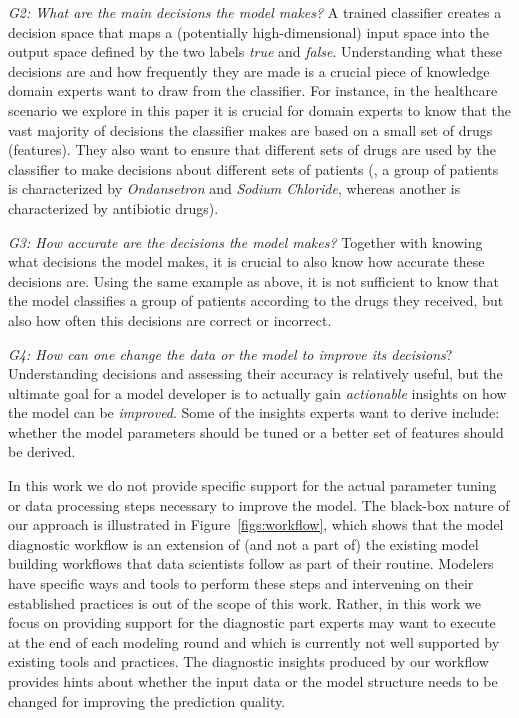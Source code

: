 \textit{G2: What are the main decisions the model makes?} A trained classifier creates a decision space that maps a (potentially high-dimensional) input space into the output space defined by the two labels \textit{true} and \textit{false}. Understanding what these decisions are and how frequently they are made is a crucial piece of knowledge domain experts want to draw from the classifier. For instance, in the healthcare scenario we explore in this paper it is crucial for domain experts to know that the vast majority of decisions the classifier makes are based on a small set of drugs (features). They also want to ensure that different sets of drugs are used by the classifier to make decisions about different sets of patients (\eg, a group of patients is characterized by \emph{Ondansetron} and \emph{Sodium Chloride}, whereas another is characterized by antibiotic drugs).

\textit{G3: How accurate are the decisions the model makes?} Together with knowing what decisions the model makes, it is crucial to also know how accurate these decisions are. Using the same example as above, it is not sufficient to know that the model classifies a group of patients according to the drugs they received, but also how often this decisions are correct or incorrect.

\textit{G4: How can one change the data or the model to improve its decisions}? Understanding decisions and assessing their accuracy is relatively useful, but the ultimate goal for a model developer is to actually gain \textit{actionable} insights on how the model can be \textit{improved}. Some of the insights experts want to derive include: whether the model parameters should be tuned or a better set of features should be derived.

In this work we do not provide specific support for the actual parameter tuning or data processing steps necessary to improve the model.
The black-box nature of our approach is illustrated in Figure~\ref{figs:workflow}, which shows that the model diagnostic workflow is an extension of (and not a part of) the existing model building workflows that data scientists follow as part of their routine. Modelers have specific ways and tools to perform these steps and intervening on their established practices is out of the scope of this work. Rather, in this work we focus on providing support for the diagnostic part experts may want to execute at the end of each modeling round and which is currently not well supported by existing tools and practices.
The diagnostic insights produced by our workflow provides hints about whether the input data or the model structure needs to be changed for improving the prediction quality.

